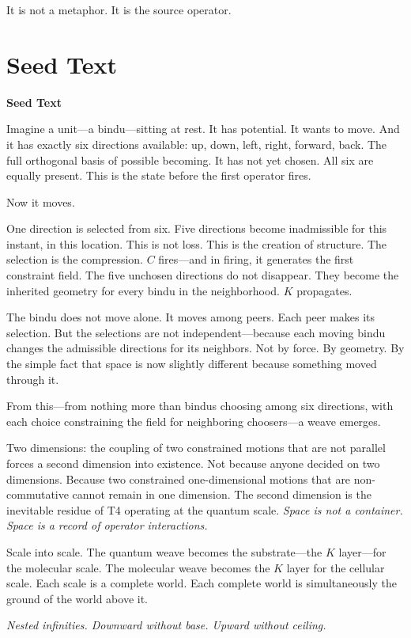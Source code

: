 \documentclass[11pt, twoside, openright]{book}
\theoremstyle{plain}
\theoremstyle{definition}
\newenvironment{seedbox}{%
  \begin{mdframed}[backgroundcolor=SeedBox,linecolor=PrincipiaDark!60,linewidth=0.5pt,innertopmargin=6pt,innerbottommargin=6pt]
  \noindent\textbf{Seed Text}\par\medskip}{\end{mdframed}}
\begin{document}
It is not a metaphor. It is the source operator.

\section{Seed Text}

\begin{seedbox}
Imagine a unit---a bindu---sitting at rest. It has potential. It wants
to move. And it has exactly six directions available: up, down, left,
right, forward, back. The full orthogonal basis of possible becoming.
It has not yet chosen. All six are equally present. This is the state
before the first operator fires.

Now it moves.

One direction is selected from six. Five directions become inadmissible
for this instant, in this location. This is not loss. This is the
creation of structure. The selection is the compression. $C$ fires---and
in firing, it generates the first constraint field. The five unchosen
directions do not disappear. They become the inherited geometry for
every bindu in the neighborhood. $K$ propagates.

The bindu does not move alone. It moves among peers. Each peer makes
its selection. But the selections are not independent---because each
moving bindu changes the admissible directions for its neighbors. Not
by force. By geometry. By the simple fact that space is now slightly
different because something moved through it.

From this---from nothing more than bindus choosing among six
directions, with each choice constraining the field for neighboring
choosers---a weave emerges.

Two dimensions: the coupling of two constrained motions that are not
parallel forces a second dimension into existence. Not because anyone
decided on two dimensions. Because two constrained one-dimensional
motions that are non-commutative cannot remain in one dimension.
The second dimension is the inevitable residue of T4 operating at
the quantum scale. \textit{Space is not a container. Space is a record of
operator interactions.}

Scale into scale. The quantum weave becomes the substrate---the $K$
layer---for the molecular scale. The molecular weave becomes the $K$
layer for the cellular scale. Each scale is a complete world.
Each complete world is simultaneously the ground of the world above it.

\textit{Nested infinities. Downward without base. Upward without ceiling.}


\end{seedbox}
\end{document}
